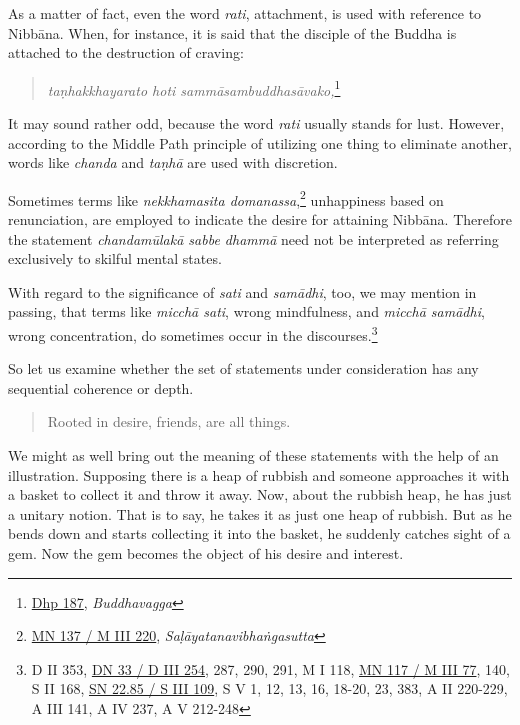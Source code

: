 As a matter of fact, even the word \emph{rati}, attachment, is used with reference to Nibbāna. When, for instance, it is said that the disciple of the Buddha is attached to the destruction of craving:

\begin{quote}
\emph{taṇhakkhayarato hoti sammāsambuddhasāvako,}\footnote{\href{https://suttacentral.net/dhp179-196/pli/ms}{Dhp 187}, \emph{Buddhavagga}}
\end{quote}

It may sound rather odd, because the word \emph{rati} usually stands for lust. However, according to the Middle Path principle of utilizing one thing to eliminate another, words like \emph{chanda} and \emph{taṇhā} are used with discretion.

Sometimes terms like \emph{nekkhamasita domanassa},\footnote{\href{https://suttacentral.net/mn137/pli/ms}{MN 137 / M III 220}, \emph{Saḷāyatanavibhaṅgasutta}} unhappiness based on renunciation, are employed to indicate the desire for attaining Nibbāna. Therefore the statement \emph{chandamūlakā sabbe dhammā} need not be interpreted as referring exclusively to skilful mental states.

With regard to the significance of \emph{sati} and \emph{samādhi}, too, we may mention in passing, that terms like \emph{micchā sati}, wrong mindfulness, and \emph{micchā samādhi}, wrong concentration, do sometimes occur in the discourses.\footnote{D II 353, \href{https://suttacentral.net/dn33/pli/ms}{DN 33 / D III 254}, 287, 290, 291, M I 118, \href{https://suttacentral.net/mn117/pli/ms}{MN 117 / M III 77}, 140, S II 168, \href{https://suttacentral.net/sn22.85/pli/ms}{SN 22.85 / S III 109}, S V 1, 12, 13, 16, 18-20, 23, 383, A II 220-229, A III 141, A IV 237, A V 212-248}

So let us examine whether the set of statements under consideration has any sequential coherence or depth.

\begin{quote}
Rooted in desire, friends, are all things.
\end{quote}

We might as well bring out the meaning of these statements with the help of an illustration. Supposing there is a heap of rubbish and someone approaches it with a basket to collect it and throw it away. Now, about the rubbish heap, he has just a unitary notion. That is to say, he takes it as just one heap of rubbish. But as he bends down and starts collecting it into the basket, he suddenly catches sight of a gem. Now the gem becomes the object of his desire and interest.

